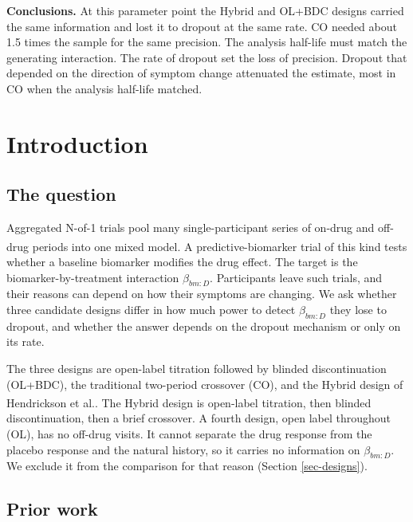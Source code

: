 \documentclass[
  11pt,
]{article}
\begin{document}
\textbf{Conclusions.} At this parameter point the Hybrid and OL+BDC
designs carried the same information and lost it to dropout at the
same rate. CO needed about 1.5 times the
sample for the same precision. The analysis half-life must match the
generating interaction. The rate of dropout set the loss of precision.
Dropout that depended on the direction of symptom change attenuated
the estimate, most in CO when the analysis half-life matched.

\section{Introduction}\label{introduction}

\subsection{The question}\label{the-question}

Aggregated N-of-1 trials pool many single-participant series of on-drug
and off-drug periods into one mixed model\textsuperscript{}. A predictive-biomarker trial
of this kind tests whether a baseline biomarker modifies the drug
effect. The target is the biomarker-by-treatment interaction
\(\beta_{bm:D}\). Participants leave such trials, and their reasons can
depend on how their symptoms are changing. We ask whether three
candidate designs differ in how much power to detect \(\beta_{bm:D}\)
they lose to dropout, and whether the answer depends on the dropout
mechanism or only on its rate.

The three designs are open-label titration followed by blinded
discontinuation (OL+BDC), the traditional two-period crossover (CO),
and the Hybrid design of Hendrickson et al.\textsuperscript{}. The Hybrid design is
open-label titration, then blinded discontinuation, then a brief
crossover. A fourth design, open label throughout (OL), has no off-drug
visits. It cannot separate the drug response from the placebo response
and the natural history, so it carries no information on
\(\beta_{bm:D}\). We exclude it from the comparison for that reason
(Section \ref{sec-designs}).

\subsection{Prior work}\label{prior-work}
\end{document}
